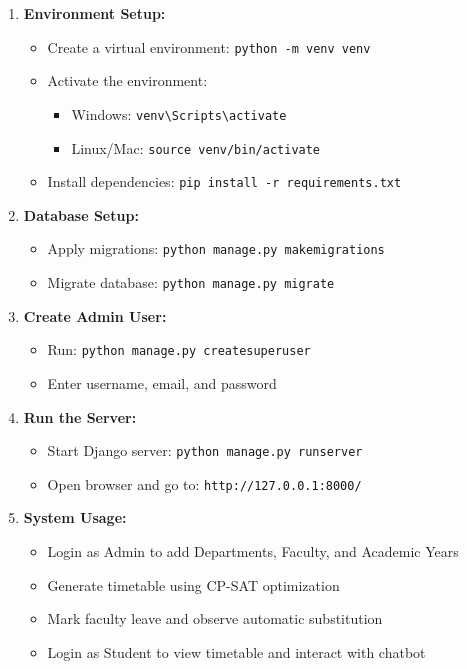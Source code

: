 \documentclass[a4paper, 12pt]{report}
\begin{document}
\begin{enumerate}

    \item \textbf{Environment Setup:}
    \begin{itemize}
        \item Create a virtual environment: \texttt{python -m venv venv}
        \item Activate the environment:
        \begin{itemize}
            \item Windows: \texttt{venv\textbackslash Scripts\textbackslash activate}
            \item Linux/Mac: \texttt{source venv/bin/activate}
        \end{itemize}
        \item Install dependencies: \texttt{pip install -r requirements.txt}
    \end{itemize}

    \item \textbf{Database Setup:}
    \begin{itemize}
        \item Apply migrations: \texttt{python manage.py makemigrations}
        \item Migrate database: \texttt{python manage.py migrate}
    \end{itemize}

    \item \textbf{Create Admin User:}
    \begin{itemize}
        \item Run: \texttt{python manage.py createsuperuser}
        \item Enter username, email, and password
    \end{itemize}

    \item \textbf{Run the Server:}
    \begin{itemize}
        \item Start Django server: \texttt{python manage.py runserver}
        \item Open browser and go to: \texttt{http://127.0.0.1:8000/}
    \end{itemize}

    \item \textbf{System Usage:}
    \begin{itemize}
        \item Login as Admin to add Departments, Faculty, and Academic Years
        \item Generate timetable using CP-SAT optimization
        \item Mark faculty leave and observe automatic substitution
        \item Login as Student to view timetable and interact with chatbot
    \end{itemize}


\end{enumerate}
\end{document}
